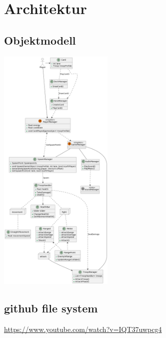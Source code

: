 \chapter{Architektur}

\section{Objektmodell}
\includegraphics[height=12cm]{resources/bla.png}


\section*{github file system}
\url{https://www.youtube.com/watch?v=IQT37uwpcg4}